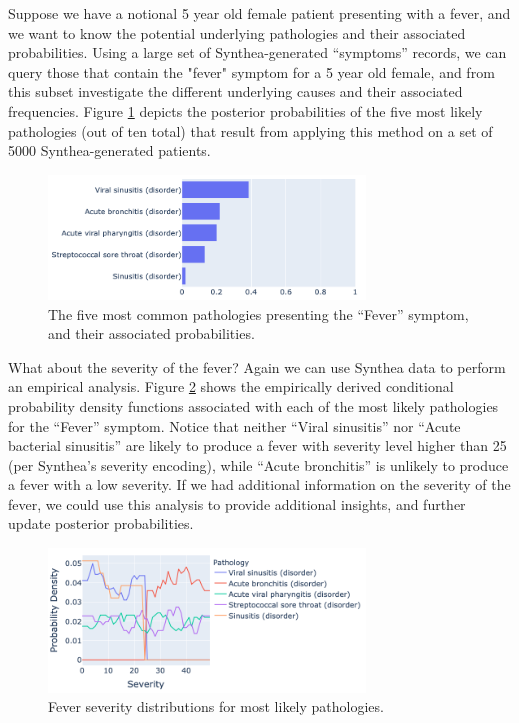 \documentclass[11pt]{article}
\begin{document}
Suppose we have a notional 5 year old female patient presenting with a fever, and we want to know the potential underlying pathologies and their associated probabilities.  Using a large set of Synthea-generated ``symptoms'' records, we can query those that contain the "fever" symptom for a 5 year old female, and from this subset investigate the different underlying causes and their associated frequencies. Figure \ref{fig: fever-pathologies} depicts the posterior probabilities of the five most likely pathologies (out of ten total) that result from applying this method on a set of 5000 Synthea-generated patients.

\begin{figure}[!hbt]\centering
  \includegraphics[width=0.75\textwidth]{figures/fever-pathologies.png}
  \caption{The five most common pathologies presenting the ``Fever'' symptom, and their associated probabilities. \label{fig: fever-pathologies}}
\end{figure}

What about the severity of the fever?  Again we can use Synthea data to perform an empirical analysis.  Figure \ref{fig: fever-severity} shows the empirically derived conditional probability density functions associated with each of the most likely pathologies for the ``Fever'' symptom.  Notice that neither ``Viral sinusitis'' nor ``Acute bacterial sinusitis'' are likely to produce a fever with severity level higher than 25 (per Synthea's severity encoding), while ``Acute bronchitis'' is unlikely to produce a fever with a low severity.  If we had additional information on the severity of the fever, we could use this analysis to provide additional insights, and further update posterior probabilities. 

\begin{figure}[!hbt]\centering
  \includegraphics[width=0.75\textwidth]{figures/fever-severity.png}
  \caption{Fever severity distributions for most likely pathologies. \label{fig: fever-severity}}
\end{figure}
\end{document}
